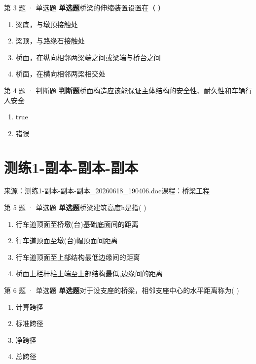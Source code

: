 \documentclass[UTF8,zihao=-4,openany]{ctexbook}
\newenvironment{choices}{\begin{enumerate}[label=\Alph*.,leftmargin=9mm,labelsep=3mm,itemsep=2pt,topsep=4pt]}{\end{enumerate}}
\newcommand{\qtype}[1]{\textcolor{brand}{\sffamily\bfseries #1}}
\newcommand{\sourcefile}[1]{\textcolor{muted}{\small\sffamily 来源：#1}}
\begin{document}
\begin{questionbox}{第 3 题 · 单选题}
\qtype{单选题}\quad 桥梁的伸缩装置设置在（ ）
\begin{choices}
\item 梁底，与墩顶接触处
\item 梁顶，与路缘石接触处
\item 桥面，在纵向相邻两梁端之间或梁端与桥台之间
\item 桥面，在横向相邻两梁相交处
\end{choices}
\end{questionbox}

\begin{questionbox}{第 4 题 · 判断题}
\qtype{判断题}\quad 桥面构造应该能保证主体结构的安全性、耐久性和车辆行人安全
\begin{choices}
\item true
\item 错误
\end{choices}
\end{questionbox}

\chapter{测练1-副本-副本-副本}

\sourcefile{测练1-副本-副本-副本\_20260618\_190406.doc}\quad \textcolor{muted}{\small\sffamily 课程：桥梁工程}

\begin{questionbox}{第 5 题 · 单选题}
\qtype{单选题}\quad 桥梁建筑高度h是指( )
\begin{choices}
\item 行车道顶面至桥墩(台)基础底面间的距离
\item 行车道顶面至墩(台)帽顶面间距离
\item 行车道顶面至上部结构最低边缘间的距离
\item 桥面上栏杆柱上端至上部结构最低,边缘间的距离
\end{choices}
\end{questionbox}

\begin{questionbox}{第 6 题 · 单选题}
\qtype{单选题}\quad 对于设支座的桥梁，相邻支座中心的水平距离称为( )
\begin{choices}
\item 计算跨径
\item 标准跨径
\item 净跨径
\item 总跨径
\end{choices}
\end{questionbox}
\end{document}
